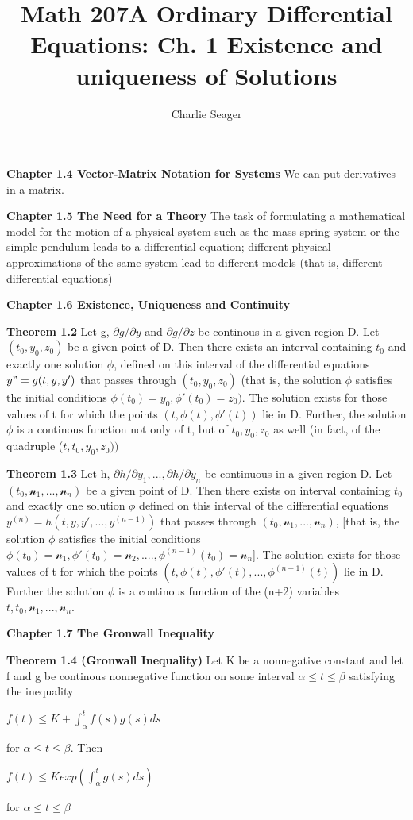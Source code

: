 \documentclass{article}
\begin{document}
\title {Math 207A Ordinary Differential Equations: Ch. 1 Existence and uniqueness of Solutions}

\author{Charlie Seager}

\maketitle

\textbf {Chapter 1.4 Vector-Matrix Notation for Systems} We can put derivatives in a matrix.

\textbf {Chapter 1.5 The Need for a Theory} The task of formulating a mathematical model for the motion of a physical system such as the mass-spring system or the simple pendulum leads to a differential equation; different physical approximations of the same system lead to different models (that is, different differential equations)

\textbf {Chapter 1.6 Existence, Uniqueness and Continuity}

\textbf {Theorem 1.2} Let g, $\partial g/ \partial y$ and $\partial g/ \partial z$ be continous in a given region D. Let $(t_0, y_0, z_0)$ be a given point of D. Then there exists an interval containing $t_0$ and exactly one solution $\phi$, defined on this interval of the differential equations $y"=g(t,y,y')$ that passes through $(t_0, y_0, z_0)$ (that is, the solution $\phi$ satisfies the initial conditions $\phi (t_0) = y_0, \phi '(t_0) = z_0)$. The solution exists for those values of t for which the points $(t, \phi (t), \phi '(t))$ lie in D. Further, the solution $\phi$ is a continous function not only of t, but of $t_0, y_0, z_0$ as well (in fact, of the quadruple ($t, t_0, y_0, z_0))$

\textbf {Theorem 1.3} Let h, $\partial h/ \partial y_1 ,..., \partial h / \partial y_n$ be continuous in a given region D. Let $(t_0, \mathcal{n}_1 ,..., \mathcal{n}_n)$ be a given point of D. Then there exists on interval containing $t_0$ and exactly one solution $\phi$ defined on this interval of the differential equations $y^{(n)} = h(t, y, y' ,..., y^{(n-1)})$ that passes through $(t_0, \mathcal{n}_1 ,..., \mathcal{n}_n)$, [that is, the solution $\phi$ satisfies the initial conditions $\phi(t_0) = \mathcal{n}_1, \phi '(t_0) = \mathcal{n}_2 ,...., \phi^{(n-1)}(t_0) = \mathcal{n}_n$]. The solution exists for those values of t for which the points $(t, \phi(t), \phi '(t) ,..., \phi^{(n-1)}(t))$ lie in D. Further the solution $\phi$ is a continous function of the (n+2) variables $t, t_0, \mathcal{n}_1 ,..., \mathcal{n}_n$.

\textbf {Chapter 1.7 The Gronwall Inequality}

\textbf {Theorem 1.4 (Gronwall Inequality)} Let K be a nonnegative constant and let f and g be continous nonnegative function on some interval $\alpha \leq t \leq \beta$ satisfying the inequality
\begin{center}
$f(t) \leq K + \int_\alpha^t f(s) g(s) ds$
\end{center}
for $\alpha \leq t \leq \beta$. Then
\begin{center}
$f(t) \leq K exp (\int_\alpha^t g(s) ds)$
\end{center}
for $\alpha \leq t \leq \beta$
\end{document}
